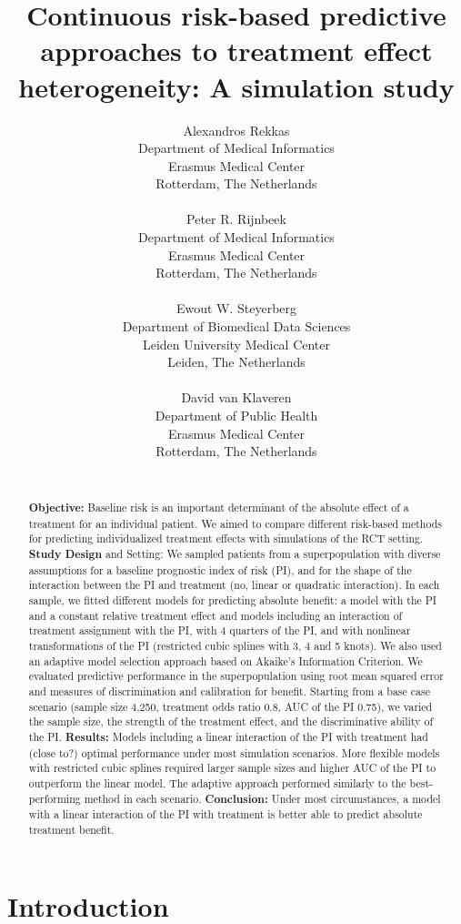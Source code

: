 \documentclass{article}
\title{Continuous risk-based predictive approaches to treatment effect
heterogeneity: A simulation study}
\author{
    Alexandros Rekkas
   \\
    Department of Medical Informatics \\
    Erasmus Medical Center \\
  Rotterdam, The Netherlands \\
  \texttt{} \\
   \And
    Peter R. Rijnbeek
   \\
    Department of Medical Informatics \\
    Erasmus Medical Center \\
  Rotterdam, The Netherlands \\
  \texttt{} \\
   \And
    Ewout W. Steyerberg
   \\
    Department of Biomedical Data Sciences \\
    Leiden University Medical Center \\
  Leiden, The Netherlands \\
  \texttt{} \\
   \And
    David van Klaveren
   \\
    Department of Public Health \\
    Erasmus Medical Center \\
  Rotterdam, The Netherlands \\
  \texttt{} \\
  }
\date{}
\begin{document}
\maketitle

\def\tightlist{}


\begin{abstract}
\textbf{Objective:} Baseline risk is an important determinant of the
absolute effect of a treatment for an individual patient. We aimed to
compare different risk-based methods for predicting individualized
treatment effects with simulations of the RCT setting. \textbf{Study
Design} and Setting: We sampled patients from a superpopulation with
diverse assumptions for a baseline prognostic index of risk (PI), and
for the shape of the interaction between the PI and treatment (no,
linear or quadratic interaction). In each sample, we fitted different
models for predicting absolute benefit: a model with the PI and a
constant relative treatment effect and models including an interaction
of treatment assignment with the PI, with 4 quarters of the PI, and with
nonlinear transformations of the PI (restricted cubic splines with 3, 4
and 5 knots). We also used an adaptive model selection approach based on
Akaike's Information Criterion. We evaluated predictive performance in
the superpopulation using root mean squared error and measures of
discrimination and calibration for benefit. Starting from a base case
scenario (sample size 4,250, treatment odds ratio 0.8, AUC of the PI
0.75), we varied the sample size, the strength of the treatment effect,
and the discriminative ability of the PI. \textbf{Results:} Models
including a linear interaction of the PI with treatment had (close to?)
optimal performance under most simulation scenarios. More flexible
models with restricted cubic splines required larger sample sizes and
higher AUC of the PI to outperform the linear model. The adaptive
approach performed similarly to the best-performing method in each
scenario. \textbf{Conclusion:} Under most circumstances, a model with a
linear interaction of the PI with treatment is better able to predict
absolute treatment benefit.
\end{abstract}


\linenumbers

\hypertarget{introduction}{%
\section{Introduction}\label{introduction}}
\end{document}
